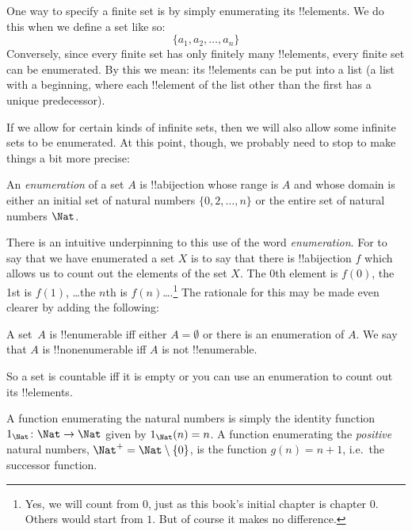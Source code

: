\documentclass[../../../include/open-logic-section]{subfiles}
\begin{document}


One way to specify a finite set is by simply enumerating its !!{element}s. We do this when we define a set like so:
$$\{a_1, a_2, \ldots, a_n\}$$
Conversely, since every finite set has only finitely many !!{element}s,
every finite set can be enumerated.  By this we mean: its !!{element}s can
be put into a list (a list with a beginning, where each !!{element} of
the list other than the first has a unique predecessor). 

If we allow for certain kinds of infinite sets, then we will also allow some infinite sets to be enumerated. At this point, though, we probably need to stop to make things a bit more precise:
\begin{defn}[Enumeration]
An \emph{enumeration} of a set $A$ is !!a{bijection} whose range is $A$ and whose domain is either an initial set of natural numbers $\{0, 2, \ldots, n\}$ {or} the entire set of natural numbers $\Nat$. 
\end{defn}
\begin{explain}
There is an intuitive underpinning to this use of the word \emph{enumeration}. For to say that we have enumerated a set $X$ is to say that there is !!a{bijection} $f$ which allows us to count out the elements of the set $X$. The $0$th element is $f(0)$, the 1st is $f(1)$, \ldots the $n$th is $f(n)$\ldots.\footnote{Yes, we will count from $0$, just as this book's initial chapter is chapter $0$. Others would start from $1$. But of course it makes no difference.} The rationale for this may be made even clearer by adding the following:
\end{explain}
\begin{defn}
  A set~$A$ is !!{enumerable} iff either $A = \emptyset$ or there is an enumeration of $A$. We say that $A$ is !!{nonenumerable} iff $A$ is not !!{enumerable}.
\end{defn}
\begin{explain}
	So a set is countable iff it is empty or you can use an enumeration to count out its !!{element}s.
\end{explain}
\begin{ex}
A function enumerating the natural numbers is simply the
identity function $1_\Nat \colon \Nat \to \Nat$ given by $1_\Nat(n) = n$. A function enumerating the \emph{positive} natural numbers, $\Nat^+ = \Nat \setminus \{0\}$, is the function $g(n) = n + 1$, i.e.\ the successor function.
\end{ex}
\end{document}
